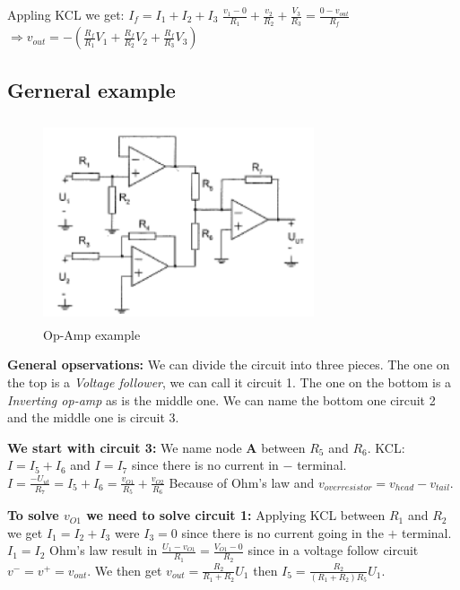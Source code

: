 \documentclass{article}
\begin{document}
Appling KCL we get: $I_f=I_1+I_2+I_3$ 
$\frac{v_1-0}{R_1} + \frac{v_2}{R_2} + \frac{V_3}{R_3} = \frac{0-v_{out}}{R_f}$
$\Rightarrow v_{out}=-(\frac{R_f}{R_1}V_1 + \frac{R_f}{R_2}V_2 + \frac{R_f}{R_3}V_3)$

\newpage
\subsection{Gerneral example}
\begin{figure}[h]
    \vspace{10mm}
    \centering
    \includegraphics[width=8cm, height=6cm]{image/op-amp-example.png}
    \caption{Op-Amp example}
\end{figure}
\textbf{General opservations:} 
We can divide the circuit into three pieces. The one on the top is a   
\textit{Voltage follower}, we can call it circuit 1. The one on the bottom
is a \textit{Inverting op-amp} as is the middle one. We can name the bottom
one circuit 2 and the middle one is circuit 3.
\vspace{3mm}

\textbf{We start with circuit 3:} \newline
We name node \textbf{A} between $R_5$ and $R_6$. KCL: $I=I_5+I_6$ and $I=I_7$ since \newline
there is no current in $-$ terminal. \newline
$I=\frac{-U_{ut}}{R_7}=I_5+I_6=\frac{v_{O1}}{R_5}+\frac{v_{O2}}{R_6}$ \newline
Because of Ohm's law and $v_{over resistor}=v_{head}-v_{tail}$. \newline
\vspace{3mm}

\textbf{To solve $v_{O1}$ we need to solve circuit 1:} \newline
Applying KCL between $R_1$ and $R_2$ we get $I_1=I_2+I_3$ were $I_3=0$ since \newline
there is no current going in the $+$ terminal. $I_1=I_2$ Ohm's law result in \newline
$\frac{U_1-v_{O1}}{R_1}=\frac{V_{O1}-0}{R_2}$ since in a voltage follow circuit \newline
$v^-=v^+=v_{out}$. We then get $v_{out}=\frac{R_2}{R_1+R_2}U_1$ \newline
then $I_5=\frac{R_2}{(R_1+R_2)R_5}U_1$. \newline
\vspace{3mm}
\end{document}
